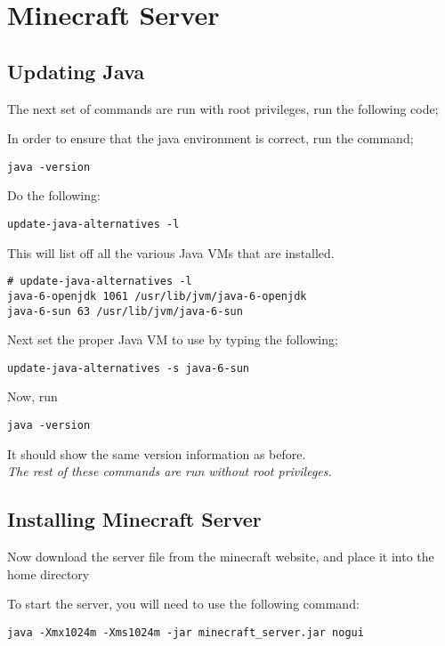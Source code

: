 \chapter{Minecraft Server}
\label{chp:minecraft}

\section{Updating Java}

The next set of commands are run with root privileges, run the following code;

In order to ensure that the java environment is correct, run the command;
\begin{lstlisting}
java -version
\end{lstlisting}

Do the following:

\begin{lstlisting}
update-java-alternatives -l
\end{lstlisting}

This will list off all the various Java VMs that are installed.

\begin{lstlisting}
# update-java-alternatives -l
java-6-openjdk 1061 /usr/lib/jvm/java-6-openjdk
java-6-sun 63 /usr/lib/jvm/java-6-sun
\end{lstlisting}

Next set the proper Java VM to use by typing the following;

\begin{lstlisting}
update-java-alternatives -s java-6-sun
\end{lstlisting}

Now, run 
\begin{lstlisting}
java -version
\end{lstlisting}

It should show the same version information as before.\\
\textit{The rest of these commands are run without root privileges.}

\section{Installing Minecraft Server}

Now download the server file from the minecraft website, and place it into the home directory

To start the server, you will need to use the following command:
\begin{lstlisting}
java -Xmx1024m -Xms1024m -jar minecraft_server.jar nogui
\end{lstlisting}

